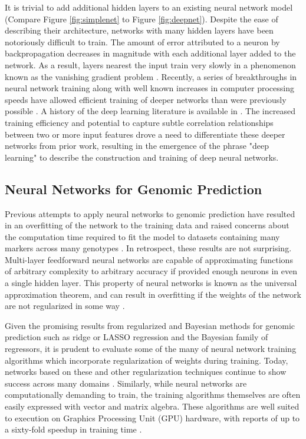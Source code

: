 
It is trivial to add additional hidden layers to an existing neural network 
model (Compare Figure \ref{fig:simplenet} to Figure \ref{fig:deepnet}). 
Despite the ease of describing their architecture, networks with many hidden 
layers have been notoriously difficult to train. The amount of error
attributed to a neuron by backpropagation decreases in magnitude with each
additional layer added to the network. As a result, layers nearest the input train
very slowly in a phenomenon known as the vanishing gradient problem \citep{hochreiter1998}. 
Recently, a series of breakthroughs in neural network training along with well known
increases in computer processing speeds have allowed efficient training
of deeper networks than were previously possible \citep{sutskever2013}.
A history of the deep learning literature is available in \cite{lecun2015}.
The increased training efficiency and potential to capture subtle
correlation relationships between two or more input features drove a need to 
differentiate these deeper networks from prior work, resulting in 
the emergence of the phrase "deep learning" to describe the construction 
and training of deep neural networks.

\subsection*{Neural Networks for Genomic Prediction}

Previous attempts to apply neural networks to genomic prediction have resulted in 
an overfitting of the network to the training data and raised 
concerns about the computation time required to fit the model to datasets containing
many markers across many genotypes \citep{heslot2012, gonzalez-recio2014}. 
In retrospect, these results are not surprising. Multi-layer feedforward neural networks 
are capable of approximating functions of arbitrary complexity to arbitrary 
accuracy if provided enough neurons in even a single hidden 
layer. This property of neural networks is known as the 
universal approximation theorem, and can result in
overfitting if the weights of the network are not regularized in some way \citep{hornik1989}.

Given the promising results from regularized and Bayesian methods for
genomic prediction such as ridge or LASSO regression and the Bayesian family of regressors,
it is prudent to evaluate some of the many of neural network training algorithms which
incorporate regularization of weights during training. Today, networks based on these
and other regularization techniques continue to show success
across many domains \citep{schmidhuber2015}. Similarly, while neural networks are 
computationally demanding to train, the training algorithms 
themselves are often easily expressed with vector and matrix algebra. These algorithms are 
well suited to execution on Graphics Processing Unit (GPU) hardware, with reports 
of up to a sixty-fold speedup in training time \citep{sierra2010, schmidhuber2015}. 

